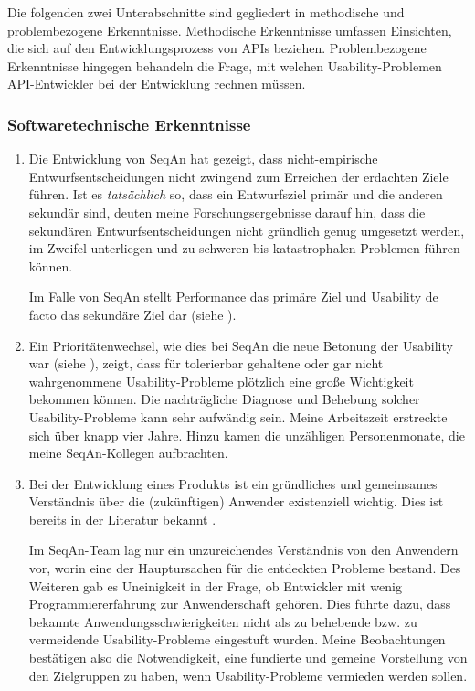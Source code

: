 Die folgenden zwei Unterabschnitte sind gegliedert in methodische und problembezogene Erkenntnisse. Methodische Erkenntnisse umfassen Einsichten, die sich auf den Entwicklungsprozess von APIs beziehen. Problembezogene Erkenntnisse hingegen behandeln die Frage, mit welchen Usability-Problemen API-Entwickler bei der Entwicklung rechnen müssen. 


\subsubsection{Softwaretechnische Erkenntnisse}

\begin{enumerate}
  \item Die Entwicklung von SeqAn hat gezeigt, dass nicht-empirische Entwurfsentscheidungen nicht zwingend zum Erreichen der erdachten Ziele führen. Ist es \textit{tatsächlich} so, dass ein Entwurfsziel primär und die anderen sekundär sind, deuten meine Forschungsergebnisse darauf hin, dass die sekundären Entwurfsentscheidungen nicht gründlich genug umgesetzt werden, im Zweifel unterliegen und zu schweren bis katastrophalen Problemen führen können.
  
  Im Falle von SeqAn stellt Performance das primäre Ziel und Usability de facto das sekundäre Ziel dar (siehe ).
  
  \item Ein Prioritätenwechsel, wie dies bei SeqAn die neue Betonung der Usability war (siehe ), zeigt, dass für tolerierbar gehaltene oder gar nicht wahrgenommene Usability-Probleme plötzlich eine große Wichtigkeit bekommen können. Die nachträgliche Diagnose und Behebung solcher Usability-Probleme kann sehr aufwändig sein. Meine Arbeitszeit erstreckte sich über knapp vier Jahre. Hinzu kamen die unzähligen Personenmonate, die meine SeqAn-Kollegen aufbrachten. %

  \item Bei der Entwicklung eines Produkts ist ein gründliches und gemeinsames Verständnis über die (zukünftigen) Anwender existenziell wichtig. Dies ist bereits in der Literatur bekannt \citep[u.a.][]{Clarke:2004te,Henning:2007kg}.
  
  Im SeqAn-Team lag nur ein unzureichendes Verständnis von den Anwendern vor, worin eine der Hauptursachen für die entdeckten Probleme bestand. Des Weiteren gab es Uneinigkeit in der Frage, ob Entwickler mit wenig Programmiererfahrung zur Anwenderschaft gehören. Dies führte dazu, dass bekannte Anwendungsschwierigkeiten nicht als zu behebende bzw. zu vermeidende Usability-Probleme eingestuft wurden. Meine Beobachtungen bestätigen also die Notwendigkeit, eine fundierte und gemeine Vorstellung von den Zielgruppen zu haben, wenn Usability-Probleme vermieden werden sollen.
\end{enumerate}


